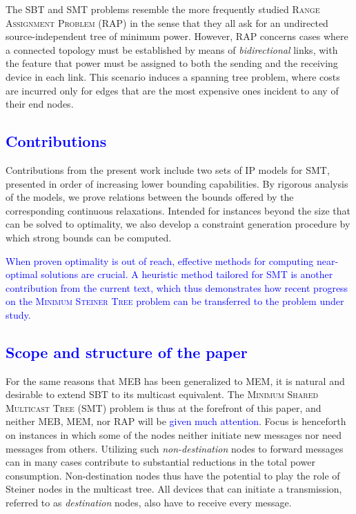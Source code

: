 The SBT and SMT problems resemble the more frequently studied \textsc{Range Assignment Problem} (RAP) in the sense that they all ask for an undirected source-independent tree of minimum power.
However, RAP concerns cases where a connected topology must be established by means of \emph{bidirectional} links,
with the feature that power must be assigned to both the sending and the receiving device in each link.
This scenario induces a spanning tree problem, where costs are incurred only for edges that are the most expensive ones incident to any of their end nodes.

\textcolor{blue}{\subsection{Contributions}}

Contributions from the present work include two sets of IP models for SMT, presented in order of increasing lower bounding capabilities.
By rigorous analysis of the models, we prove relations between the bounds offered by the corresponding continuous relaxations.
Intended for instances beyond the size that can be solved to optimality, we also develop a constraint generation procedure by which strong bounds can be computed.

\textcolor{blue}{When proven optimality is out of reach, effective methods for computing near-optimal solutions are crucial.
A heuristic method tailored for SMT is another contribution from the current text,
which thus demonstrates how recent progress on the \textsc{Minimum Steiner Tree} problem can be transferred to the problem under study.}

\textcolor{blue}{\subsection{Scope and structure of the paper}}

For the same reasons that MEB has been generalized to MEM, it is natural and desirable to extend SBT to its multicast equivalent.
The \textsc{Minimum Shared Multicast Tree} (SMT) problem is thus at the forefront of this paper,
and neither MEB, MEM, nor RAP will be \textcolor{blue}{given much attention}.
Focus is henceforth on instances in which some of the nodes neither initiate new messages nor need messages from others.
Utilizing such \emph{non-destination} nodes to forward messages can in many cases contribute to substantial reductions in the total power consumption.
Non-destination nodes thus have the potential to play the role of Steiner nodes in the multicast tree.
All devices that can initiate a transmission, referred to as \emph{destination} nodes, also have to receive every message.

